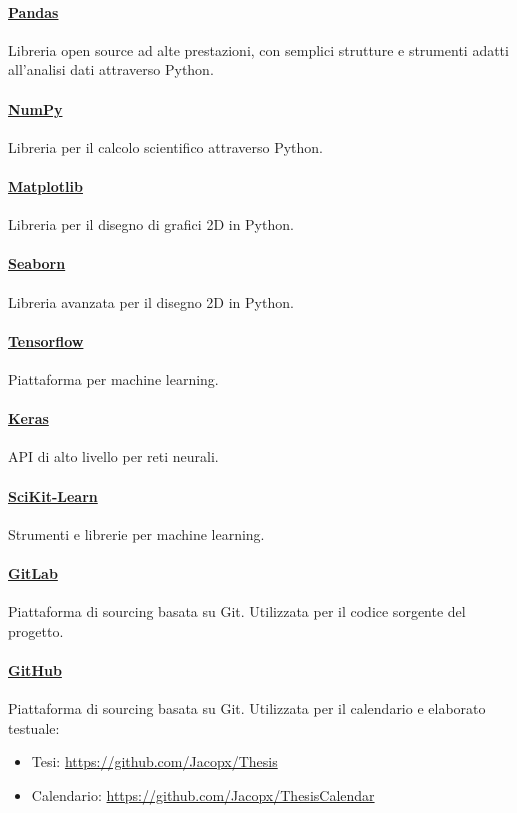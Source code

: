 \documentclass[%
    corpo=12pt,
    twoside,
    oldstyle,
    autoretitolo,
    greek,
    evenboxes,
]{toptesi}
\begin{document}
\paragraph{\href{https://pandas.pydata.org/}{Pandas}} Libreria open source ad alte prestazioni, con semplici strutture e strumenti adatti all'analisi dati attraverso Python.

\paragraph{\href{https://numpy.org/}{NumPy}} Libreria per il calcolo scientifico attraverso Python.

\paragraph{\href{https://matplotlib.org/}{Matplotlib}} Libreria per il disegno di grafici 2D in Python.

\paragraph{\href{https://seaborn.pydata.org/}{Seaborn}} Libreria avanzata per il disegno 2D in Python.

\paragraph{\href{https://www.tensorflow.org/}{Tensorflow}} Piattaforma per machine learning.

\paragraph{\href{https://keras.io/}{Keras}} API di alto livello per reti neurali.

\paragraph{\href{https://scikit-learn.org/stable/}{SciKit-Learn}} Strumenti e librerie per machine learning.

\paragraph{\href{https://gitlab.com}{GitLab}} Piattaforma di sourcing basata su Git. Utilizzata per il codice sorgente del progetto.

\paragraph{\href{https://github.com}{GitHub}} Piattaforma di sourcing basata su Git. Utilizzata per il calendario e elaborato testuale:
\begin{itemize}
  \item Tesi: \url{https://github.com/Jacopx/Thesis}
  \item Calendario: \url{https://github.com/Jacopx/ThesisCalendar}
\end{itemize}
\end{document}
